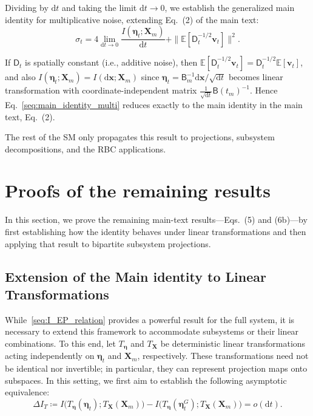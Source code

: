 \documentclass[
 longbibliography,
 twocolumn,
 superscriptaddress,
 amsmath,
 amssymb,
 amsthm,
 amsfonts,
 prl,
 floatfix,
]{revtex4-2}
\newcommand{\matbf}[1]{\boldsymbol{\mathsf{#1}}}
\begin{document}
\begin{widetext}
Dividing by $\mathrm dt$ and taking the limit $\mathrm dt \to 0$, we establish the generalized main identity for multiplicative noise, extending Eq.~(2) of the main text:
\begin{equation}
    \sigma_t
    =4\lim_{\mathrm dt\rightarrow0}
    \frac{I(\bm\eta_t;\bm X_m)}{\mathrm dt}
    +\|\mathbb E[\matbf D_t^{-1/2}\bm v_t]\|^2.
    \label{seq:main_identity_multi}
\end{equation}

If $\matbf D_t$ is spatially constant (i.e., additive noise), then $\mathbb E[\matbf D_t^{-1/2}\bm v_t] = \matbf D_t^{-1/2}\mathbb E[\bm v_t]$, and also $I(\bm\eta_t;\bm X_m)=I(\mathrm d\bm x;\bm X_m)$ since $\bm\eta_t=\matbf B_m^{-1}\mathrm d\bm x/\sqrt{\mathrm dt}$ becomes linear transformation with coordinate-independent matrix $\frac{1}{\sqrt{\mathrm dt}}\matbf B(t_m)^{-1}$. Hence Eq.~\eqref{seq:main_identity_multi} reduces exactly to the main identity in the main text, Eq.~(2).

The rest of the SM only propagates this result to projections, subsystem decompositions, and the RBC applications.

\section{Proofs of the remaining results}
\vspace*{-0.6\baselineskip}

In this section, we prove the remaining main-text results---Eqs.~(5) and (6b)---by first establishing how the identity behaves under linear transformations and then applying that result to bipartite subsystem projections.

\subsection{Extension of the Main identity to Linear Transformations}
\vspace*{-0.6\baselineskip}

While~\eqref{seq:I_EP_relation} provides a powerful result for the full system, it is necessary to extend this framework to accommodate subsystems or their linear combinations. To this end, let $T_{\bm\eta}$ and $T_{\bm X}$ be deterministic linear transformations acting independently on $\bm\eta_t$ and $\bm X_m$, respectively. These transformations need not be identical nor invertible; in particular, they can represent projection maps onto subspaces. In this setting, we first aim to establish the following asymptotic equivalence:
\begin{equation}
    \Delta I_T\coloneq
    I\big(T_{\bm\eta}(\bm\eta_t);T_{\bm X}(\bm X_m)\big)
    -I\big(T_{\bm\eta}(\bm\eta_t^G);T_{\bm X}(\bm X_m)\big)
    =o(\mathrm dt).
    \label{seq:deltaI_T_odt}
\end{equation}


\end{widetext}
\end{document}
